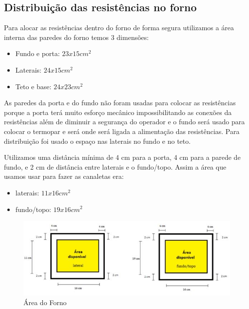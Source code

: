 \subsection{Distribuição das resistências no forno}
Para alocar as resistências dentro do forno de forma segura utilizamos a área interna das paredes do forno temos 3 dimensões:
\begin{itemize}
	\item Fundo e porta: $23x15 cm^2$
	\item Laterais: $24x15cm^2$
	\item Teto e base: $24x23cm^2$
\end{itemize}


As paredes da porta e do fundo não foram usadas para colocar as resistências porque a porta terá muito esforço mecânico impossibilitando as conexões da resistências além de diminuir a segurança do operador e o fundo será usado para colocar o termopar e será onde será ligada a alimentação das resistências. Para distribuição foi usado o espaço nas laterais no fundo e no teto.

Utilizamos uma distância mínima de 4 cm para a porta, 4 cm para a parede de fundo, e 2 cm de distância entre laterais e o fundo/topo. Assim a área que usamos usar para fazer as canaletas era:
\begin{itemize}
	\item laterais: $11x16cm^2$
	\item fundo/topo: $19x16cm^2$
\end{itemize}
\begin{figure}[ht]
	\centering
	\label{areaforno}
	\includegraphics[keepaspectratio=true,scale=1.0]{figuras/alimentacao2.JPG}
	\caption{Área do Forno}
\end{figure}

